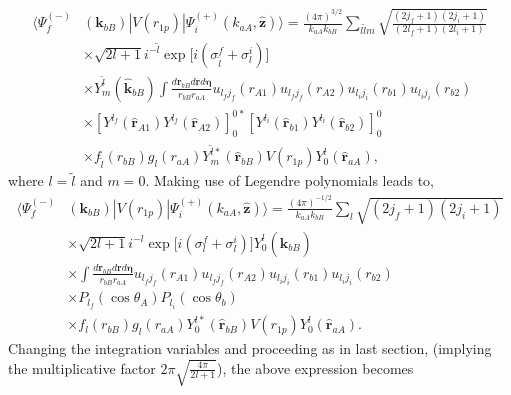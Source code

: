 \begin{equation}\label{eq209}
  \begin{split}
  \langle \Psi_f^{(-)}&(\mathbf{k}_{bB})|V(r_{1p})|\Psi_i^{(+)}(k_{aA},\hat {\mathbf{z}})\rangle=\frac{(4\pi)^{3/2}}{k_{aA}k_{bB}}\sum_{l \tilde l m}
  \sqrt{\frac{(2j_f+1)(2j_i+1)}{(2l_f+1)(2l_i+1)}}\\
  &\times \sqrt{2l+1}
 i^{-\tilde l}\exp\bigl[i(\sigma_{\tilde l}^f+\sigma_{l}^i)\bigr]\\
  &\times  Y_{m}^{\tilde l}(\hat{\mathbf{k}}_{bB}) \int \frac {d\mathbf{r}_{bB}d\mathbf{r}d\boldsymbol{\eta}}{r_{bB} r_{aA}} u_{l_f j_f}(r_{A1})u_{l_f j_f}(r_{A2})u_{l_i j_i}(r_{b1})u_{l_i j_i}(r_{b2})\\
  &\times \left[Y^{l_f}(\hat{\mathbf{r}}_{A1})Y^{l_f}(\hat{\mathbf{r}}_{A2})\right]^{0*}_{0}
  \left[Y^{l_i}(\hat{\mathbf{r}}_{b1})Y^{l_i}(\hat{\mathbf{r}}_{b2})\right]^{0}_{0}\\
  &\times f_{\tilde l}(r_{bB})g_{l}(r_{aA})Y_{m}^{\tilde l*}(\hat{\mathbf{r}}_{bB}) V(r_{1p})Y_0^{l}
    (\hat{\mathbf{r}}_{aA}),
  \end{split}
\end{equation}
where $l=\tilde l$ and $m=0$. Making use of  Legendre polynomials leads to,
\begin{equation}\label{eq7_2_46}
  \begin{split}
  \langle \Psi_f^{(-)}&(\mathbf{k}_{bB})|V(r_{1p})|\Psi_i^{(+)}(k_{aA},\hat {\mathbf{z}})\rangle=\frac{(4\pi)^{-1/2}}{k_{aA}k_{bB}}\sum_{l}
  \sqrt{(2j_f+1)(2j_i+1)}\\
  &\times \sqrt{2l+1}
 i^{-l}\exp\bigl[i(\sigma_{l}^f+\sigma_{l}^i)\bigr]Y_{0}^{l}(\hat{\mathbf{k}}_{bB})\\
  &\times \int \frac {d\mathbf{r}_{bB}d\mathbf{r}d\boldsymbol{\eta}}{r_{bB} r_{aA}} u_{l_f j_f}(r_{A1})u_{l_f j_f}(r_{A2})u_{l_i j_i}(r_{b1})u_{l_i j_i}(r_{b2})\\
  &\times P_{l_f}(\cos \theta_A)
  P_{l_i}(\cos \theta_b)\\
  &\times f_{l}(r_{bB})g_{l}(r_{aA})Y_{0}^{l*}(\hat{\mathbf{r}}_{bB}) V(r_{1p})Y_0^{l}
    (\hat{\mathbf{r}}_{aA}).
  \end{split}
\end{equation}
Changing the integration variables and proceeding as in last section, (implying the   multiplicative factor  $2\pi\sqrt{\frac{4\pi}{2l+1}}$), the above expression becomes
